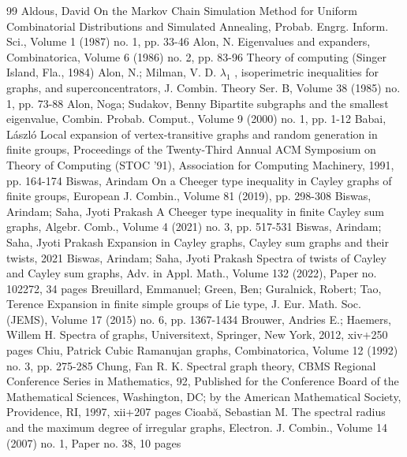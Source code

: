 \documentclass[10pt]{article}
\theoremstyle{definition}
\begin{document}
\begin{thebibliography}{99}
Aldous, David On the Markov Chain Simulation Method for Uniform Combinatorial Distributions and Simulated Annealing, Probab. Engrg. Inform. Sci., Volume 1 (1987) no. 1, pp. 33-46
Alon, N. Eigenvalues and expanders, Combinatorica, Volume 6 (1986) no. 2, pp. 83-96 Theory of computing (Singer Island, Fla., 1984)
Alon, N.; Milman, V. D. \(\lambda_1\) , isoperimetric inequalities for graphs, and superconcentrators, J. Combin. Theory Ser. B, Volume 38 (1985) no. 1, pp. 73-88
Alon, Noga; Sudakov, Benny Bipartite subgraphs and the smallest eigenvalue, Combin. Probab. Comput., Volume 9 (2000) no. 1, pp. 1-12
Babai, László Local expansion of vertex-transitive graphs and random generation in finite groups, Proceedings of the Twenty-Third Annual ACM Symposium on Theory of Computing (STOC ’91), Association for Computing Machinery, 1991, pp. 164-174
Biswas, Arindam On a Cheeger type inequality in Cayley graphs of finite groups, European J. Combin., Volume 81 (2019), pp. 298-308
Biswas, Arindam; Saha, Jyoti Prakash A Cheeger type inequality in finite Cayley sum graphs, Algebr. Comb., Volume 4 (2021) no. 3, pp. 517-531
Biswas, Arindam; Saha, Jyoti Prakash Expansion in Cayley graphs, Cayley sum graphs and their twists, 2021
Biswas, Arindam; Saha, Jyoti Prakash Spectra of twists of Cayley and Cayley sum graphs, Adv. in Appl. Math., Volume 132 (2022), Paper no. 102272, 34 pages
Breuillard, Emmanuel; Green, Ben; Guralnick, Robert; Tao, Terence Expansion in finite simple groups of Lie type, J. Eur. Math. Soc. (JEMS), Volume 17 (2015) no. 6, pp. 1367-1434
Brouwer, Andries E.; Haemers, Willem H. Spectra of graphs, Universitext, Springer, New York, 2012, xiv+250 pages
Chiu, Patrick Cubic Ramanujan graphs, Combinatorica, Volume 12 (1992) no. 3, pp. 275-285
Chung, Fan R. K. Spectral graph theory, CBMS Regional Conference Series in Mathematics, 92, Published for the Conference Board of the Mathematical Sciences, Washington, DC; by the American Mathematical Society, Providence, RI, 1997, xii+207 pages
Cioabă, Sebastian M. The spectral radius and the maximum degree of irregular graphs, Electron. J. Combin., Volume 14 (2007) no. 1, Paper no. 38, 10 pages

\end{thebibliography}
\end{document}
